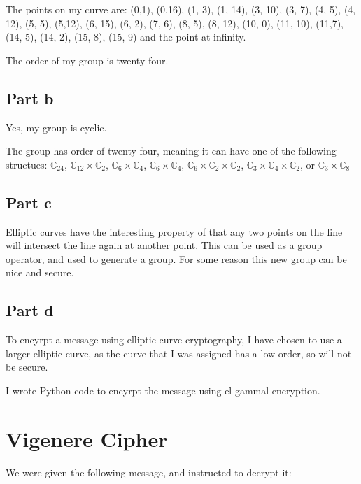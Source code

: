 \documentclass[11pt,a4paper,twoside]{article}
\begin{document}
The points on my curve are: (0,1), (0,16), (1, 3), (1, 14), (3, 10), (3, 7),
(4, 5), (4, 12), (5, 5), (5,12), (6, 15), (6, 2), (7, 6), (8, 5), (8, 12), (10,
0), (11, 10), (11,7), (14, 5), (14, 2), (15, 8), (15, 9) and the point at
infinity. 

The order of my group is twenty four. 

\subsection{Part b}
Yes, my group is cyclic.

The group has order of twenty four, meaning it can have one of the following
structues: $\mathbb{C}_{24}$, $\mathbb{C}_{12}\times\mathbb{C}_{2}$,
$\mathbb{C}_{6}\times\mathbb{C}_{4}$, $\mathbb{C}_{6}\times\mathbb{C}_{4}$,
$\mathbb{C}_{6}\times\mathbb{C}_{2}\times\mathbb{C}_{2}$,
$\mathbb{C}_{3}\times\mathbb{C}_{4}\times\mathbb{C}_{2}$, or
$\mathbb{C}_{3}\times\mathbb{C}_{8}$


\subsection{Part c}
Elliptic curves have the interesting property of that any two points on the
line will intersect the line again at another point. This can be used as a
group operator, and used to generate a group. For some reason this new group
can be nice and secure.  

\subsection{Part d}
To encyrpt a message using elliptic curve cryptography, I have chosen to use a
larger elliptic curve, as the curve that I was assigned has a low order, so
will not be secure. 

I wrote Python code to encyrpt the message using el gammal encryption. 

\vfill
\pagebreak
\section{Vigenere Cipher}
We were given the following message, and instructed to decrypt it:
\end{document}
